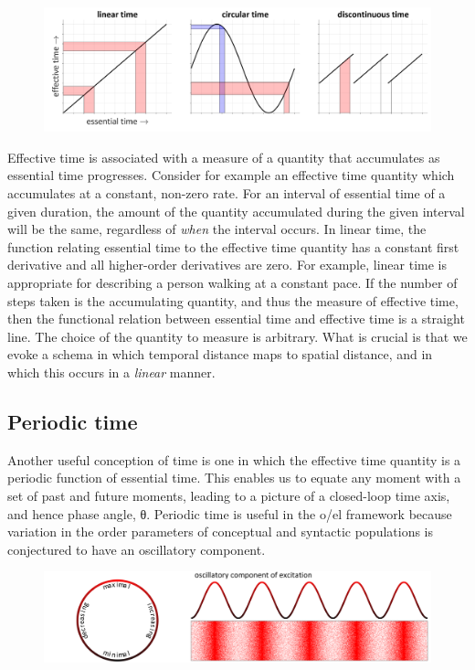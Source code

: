   
\begin{figure}
\includegraphics[width=\textwidth]{figures/Tilsen-img45.png}
\caption{\missingcaption}
\label{fig:3:17}
\end{figure}
 

  Effective time is associated with a measure of a quantity that accumulates as essential time progresses. Consider for example an effective time quantity which accumulates at a constant, non-zero rate. For an interval of essential time of a given duration, the amount of the quantity accumulated during the given interval will be the same, regardless of \textit{when} the interval occurs. In linear time, the function relating essential time to the effective time quantity has a constant first derivative and all higher-order derivatives are zero. For example, linear time is appropriate for describing a person walking at a constant pace. If the number of steps taken is the accumulating quantity, and thus the measure of effective time, then the functional relation between essential time and effective time is a straight line. The choice of the quantity to measure is arbitrary. What is crucial is that we evoke a schema in which temporal distance maps to spatial distance, and in which this occurs in a \textit{linear} manner.

\subsection{Periodic time}

Another useful conception of time is one in which the effective time quantity is a periodic function of  essential time. This enables us to equate any moment with a set of past and future moments, leading to a picture of a closed-loop time axis, and hence phase angle, θ. Periodic time is useful in the o/el framework because variation in the order parameters of conceptual and syntactic populations is conjectured to have an oscillatory component.

  
\begin{figure}
\includegraphics[width=\textwidth]{figures/Tilsen-img46.png}
\caption{\missingcaption}
\label{fig:3:18}
\end{figure}
 

